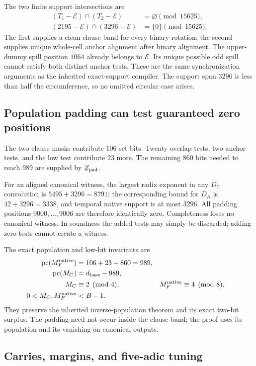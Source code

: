 \documentclass[11pt,a4paper]{article}
\theoremstyle{remark}\newtheorem{remark}[theorem]{Remark}
\newcommand{\pc}{\operatorname{pc}}
\begin{document}
The two finite support intersections are
\begin{align*}
 (T_1-\mathcal E)\cap(T_2-\mathcal E)&=\varnothing
                         \pmod{15625},\\
 (2195-\mathcal E)\cap(3296-\mathcal E)&=\{0\}
                         \pmod{15625}.
\end{align*}
The first supplies a clean clause band for every binary rotation; the
second supplies unique whole-cell anchor alignment after binary alignment.
The upper-dummy spill position $1064$ already belongs to $\mathcal E$.
Its unique possible odd spill cannot satisfy both distinct anchor tests.
These are the same synchronization arguments as the inherited exact-support
compiler. The support span $3296$ is less than half the circumference,
so no omitted circular case arises.

\subsection{Population padding can test guaranteed zero positions}

The two clause masks contribute $106$ set bits. Twenty overlap tests,
two anchor tests, and the low test contribute $23$ more. The remaining
$860$ bits needed to reach $989$ are supplied by $Z_{\rm pad}$.

For an aligned canonical witness, the largest radix exponent in any
$D_C$ convolution is $5495+3296=8791$; the corresponding bound for
$D_R$ is $42+3296=3338$, and temporal native support is at most $3296$.
All padding positions $9000,\ldots,9006$ are therefore identically zero.
Completeness loses no canonical witness. In soundness the added tests
may simply be discarded; adding zero tests cannot create a witness.

The exact population and low-bit invariants are
\begin{align*}
 \pc(M_F^{\rm native})&=106+23+860=989,\\
 \pc(M_C)&=d_{\rm base}-989,\\
 M_C&\equiv2\pmod4,&M_F^{\rm native}&\equiv4\pmod8,\\
 0<M_C,M_F^{\rm native}&<B-1.
\end{align*}
They preserve the inherited inverse-population theorem and its exact
two-bit surplus. The padding need not occur inside the clause band;
the proof uses its population and its vanishing on canonical outputs.

\subsection{Carries, margins, and five-adic tuning}
\end{document}
